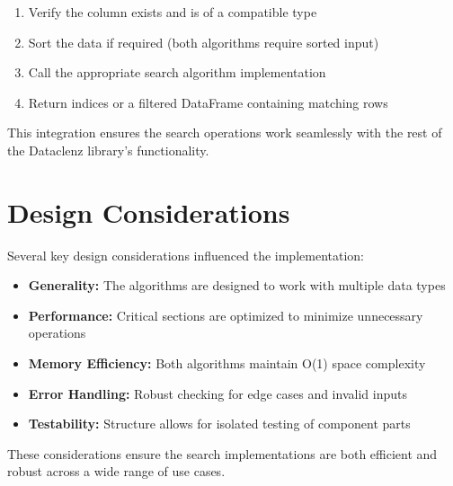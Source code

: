 \begin{enumerate}
    \item Verify the column exists and is of a compatible type
    \item Sort the data if required (both algorithms require sorted input)
    \item Call the appropriate search algorithm implementation
    \item Return indices or a filtered DataFrame containing matching rows
\end{enumerate}

This integration ensures the search operations work seamlessly with the rest of the Dataclenz library's functionality.

\section{Design Considerations}

Several key design considerations influenced the implementation:

\begin{itemize}
    \item \textbf{Generality:} The algorithms are designed to work with multiple data types
    \item \textbf{Performance:} Critical sections are optimized to minimize unnecessary operations
    \item \textbf{Memory Efficiency:} Both algorithms maintain O(1) space complexity
    \item \textbf{Error Handling:} Robust checking for edge cases and invalid inputs
    \item \textbf{Testability:} Structure allows for isolated testing of component parts
\end{itemize}

These considerations ensure the search implementations are both efficient and robust across a wide range of use cases.